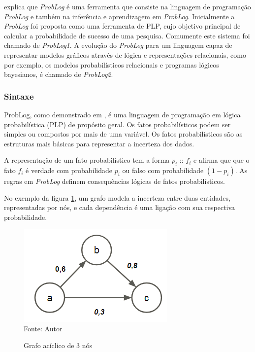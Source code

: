 \documentclass[
	12pt,				%
    oneside,			%
	a4paper,			%
	english,			%
	french,				%
	spanish,			%
	brazil,				%
	]{abntex2}
\begin{document}
 explica que \textit{ProbLog} é uma ferramenta que consiste na linguagem de programação \textit{ProbLog} e também na inferência e aprendizagem em \textit{ProbLog}. Inicialmente a \textit{ProbLog} foi proposta como uma ferramenta de PLP, cujo objetivo principal de calcular a probabilidade de sucesso de uma pesquisa. Comumente este sistema foi chamado de \textit{ProbLog1}. A evolução do \textit{ProbLog} para um linguagem capaz de representar modelos gráficos através de lógica e representações relacionais, como por exemplo, os modelos probabilísticos relacionais e programas lógicos bayesianos, é chamado de \textit{ProbLog2}. 

\subsubsection{Sintaxe}
ProbLog, como demonstrado em , é uma linguagem de programação em lógica probabilística (PLP) de propósito geral. Os fatos probabilísticos podem ser simples ou compostos por mais de uma variável. Os fatos probabilísticos são as estruturas mais básicas para representar a incerteza dos dados.

A representação de um fato probabilístico tem a forma $p_{i}$ :: $f_{i}$ e afirma que que o fato $f_{i}$ é verdade com probabilidade $p_{i}$ ou falso com probabilidade $(1-p_{i})$. As regras em \textit{ProbLog} definem consequências lógicas de fatos probabilísticos. 

No exemplo da figura \ref{fig:graph_acyclic}, um grafo modela a incerteza entre duas entidades, representadas por nós, e cada dependência é uma ligação com sua respectiva probabilidade.


\begin{figure}[H]
    \centering
    \caption{Grafo acíclico de 3 nós}
    \includegraphics[scale=1.3]{graph_acyclic1}\\
    Fonte: Autor\hfill
    \label{fig:graph_acyclic}
\end{figure} 
\end{document}
